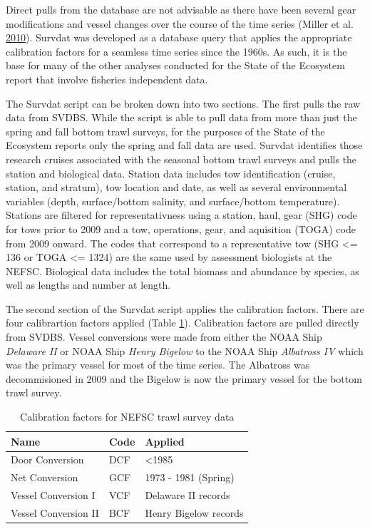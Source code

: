 \documentclass[
]{book}
\begin{document}
Direct pulls from the database are not advisable as there have been several gear modifications and
vessel changes over the course of the time series (Miller et al. \protect\hyperlink{ref-Miller_2010}{2010}). Survdat was developed as a database
query that applies the appropriate calibration factors for a seamless time series since the 1960s.
As such, it is the base for many of the other analyses conducted for the State of the Ecosystem
report that involve fisheries independent data.

The Survdat script can be broken down into two sections. The first pulls the raw data from SVDBS.
While the script is able to pull data from more than just the spring and fall bottom trawl surveys,
for the purposes of the State of the Ecosystem reports only the spring and fall data are used.
Survdat identifies those research cruises associated with the seasonal bottom trawl surveys and pulls
the station and biological data. Station data includes tow identification (cruise, station,
and stratum), tow location and date, as well as several environmental variables (depth, surface/bottom salinity,
and surface/bottom temperature). Stations are filtered for representativness using a station, haul, gear
(SHG) code for tows prior to 2009 and a tow, operations, gear, and aquisition (TOGA) code from 2009
onward. The codes that correspond to a representative tow (SHG \textless{}= 136 or TOGA \textless{}= 1324) are the same
used by assessment biologists at the NEFSC. Biological data includes the total biomass and abundance
by species, as well as lengths and number at length.

The second section of the Survdat script applies the calibration factors. There are four calibrartion
factors applied (Table \ref{tab:calibration}). Calibration factors are pulled directly from SVDBS. Vessel conversions were made from
either the NOAA Ship \emph{Delaware II} or NOAA Ship \emph{Henry Bigelow} to the NOAA Ship \emph{Albatross IV} which was
the primary vessel for most of the time series. The Albatross was decommisioned in 2009 and the Bigelow is
now the primary vessel for the bottom trawl survey.

\begin{table}

\caption{\label{tab:calibration}Calibration factors for NEFSC trawl survey data}
\centering
\begin{tabular}[t]{lll}
\toprule
Name & Code & Applied\\
\midrule
Door Conversion & DCF & <1985\\
Net Conversion & GCF & 1973 - 1981 (Spring)\\
Vessel Conversion I & VCF & Delaware II records\\
Vessel Conversion II & BCF & Henry Bigelow records\\
\bottomrule
\end{tabular}
\end{table}
\end{document}
